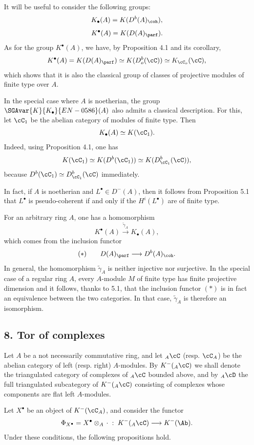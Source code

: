 It will be useful to consider the following groups:
\[
K_\bullet(A)=K(D^b(A)_{\coh}),
\]
\[
K^\bullet(A)=K(D(A)_{\parf}).
\]
As for the group $K^\bullet(A)$, we have, by Proposition 4.1 and its corollary,
\[
K^\bullet(A)=K(D(A)_{\parf})\simeq K(D_o^b(\cC))\simeq K_{\cC_o}(\cC),
\]
which shows that it is also the classical group of classes of projective modules of finite type over $A$.

In the special case where $A$ is noetherian, the group $\SGAvar{K}{K_\bullet}{EN-0586}(A)$ also admits a classical description. For this, let $\cC_1$ be the abelian category of modules of finite type. Then
\[
K_\bullet(A)\simeq K(\cC_1).
\]
Indeed, using Proposition 4.1, one has
\[
K(\cC_1)\simeq K(D^b(\cC_1))\simeq K(D^b_{\cC_1}(\cC)),
\]
because $D^b(\cC_1)\simeq D^b_{\cC_1}(\cC)$ immediately.

In fact, if $A$ is noetherian and $L^\bullet\in D^-(A)$, then it follows from Proposition 5.1 that $L^\bullet$ is pseudo-coherent if and only if the $H^i(L^\bullet)$ are of finite type.

For an arbitrary ring $A$, one has a homomorphism
\[
K^\bullet(A)\xrightarrow{\widetilde\gamma_A}K_\bullet(A),
\]
which comes from the inclusion functor
\[
(*)\qquad D(A)_{\parf}\longrightarrow D^b(A)_{\coh}.
\]
In general, the homomorphism $\widetilde\gamma_A$ is neither injective nor surjective. In the special case of a regular ring $A$, every $A$-module $M$ of finite type has finite projective dimension and it follows, thanks to 5.1, that the inclusion functor $(*)$ is in fact an equivalence between the two categories. In that case, $\widetilde\gamma_A$ is therefore an isomorphism.

\subsection*{8. Tor of complexes}

Let $A$ be a not necessarily commutative ring, and let ${}_A\cC$ (resp. $\cC_A$) be the abelian category of left (resp. right) $A$-modules. By $K^-({}_A\cC)$ we shall denote the triangulated category of complexes of ${}_A\cC$ bounded above, and by ${}_A\cD$ the full triangulated subcategory of $K^-({}_A\cC)$ consisting of complexes whose components are flat left $A$-modules.

Let $X^\bullet$ be an object of $K^-(\cC_A)$, and consider the functor
\[
\Phi_{X^\bullet}=X^\bullet\otimes_A\,\cdot\;:\;K^-({}_A\cC)\longrightarrow K^-(\Ab).
\]
Under these conditions, the following propositions hold.

